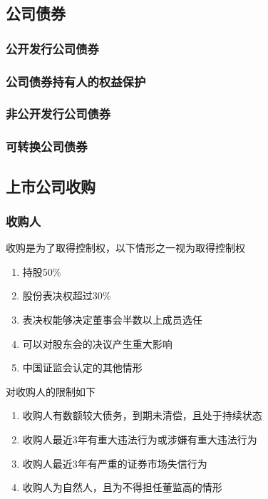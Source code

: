 \documentclass[UTF8,12pt]{ctexart}
\numberwithin{equation}{section} %
\numberwithin{figure}{section}
\numberwithin{table}{section}
\begin{document}
	
	\subsection{公司债券}
	\subsubsection{公开发行公司债券}
	
	\subsubsection{公司债券持有人的权益保护}
	
	\subsubsection{非公开发行公司债券}
	
	\subsubsection{可转换公司债券}
	
	\subsection{上市公司收购}
	\subsubsection{收购人}
	收购是为了取得控制权，以下情形之一视为取得控制权
	\begin{enumerate}
		\item 持股50\%
		
		\item 股份表决权超过30\%
		
		\item 表决权能够决定董事会半数以上成员选任
		
		\item 可以对股东会的决议产生重大影响
		
		\item 中国证监会认定的其他情形
	\end{enumerate}
	
	对收购人的限制如下
	\begin{enumerate}
		\item 收购人有数额较大债务，到期未清偿，且处于持续状态
		
		\item 收购人最近3年有重大违法行为或涉嫌有重大违法行为
		
		\item 收购人最近3年有严重的证券市场失信行为
		
		\item 收购人为自然人，且为不得担任董监高的情形
	\end{enumerate}
	
\end{document}
